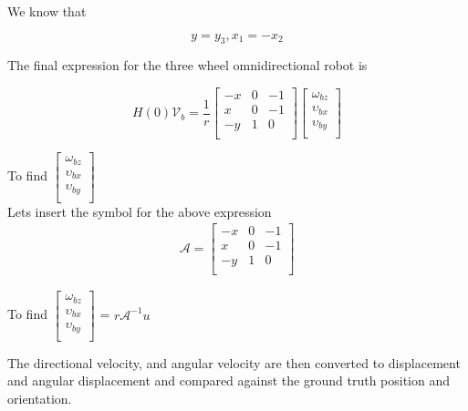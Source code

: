 \documentclass[12pt, twoside]{report}
\begin{document}
We know that

\begin{equation}
    y = y_3,  x_1 = -x_2
\end{equation}

The final expression for the three wheel omnidirectional robot is

\begin{equation}
    H(0)\mathcal{V}_b = \frac{1}{r}
    \begin{bmatrix}
        -x & 0 & -1 \\
        x  & 0 & -1 \\
        -y & 1 & 0  \\

    \end{bmatrix}
    \begin{bmatrix}
        \omega_{bz}   \\
        \upsilon_{bx} \\
        \upsilon_{by} \\
    \end{bmatrix}
\end{equation}

To find
$
    \begin{bmatrix}
        \omega_{bz}   \\
        \upsilon_{bx} \\
        \upsilon_{by} \\
    \end{bmatrix}
$\\

Lets insert the symbol for the above expression
\begin{align}
    \mathcal{A}  =
    \begin{bmatrix}
        -x & 0 & -1 \\
        x  & 0 & -1 \\
        -y & 1 & 0  \\
    \end{bmatrix}
\end{align}


To find
$
    \begin{bmatrix}
        \omega_{bz}   \\
        \upsilon_{bx} \\
        \upsilon_{by} \\
    \end{bmatrix}
$ = $r\mathcal{A}^{-1} u$

The directional velocity, and angular velocity are then converted to displacement and angular displacement
and compared against
the ground truth position and orientation.
\end{document}
